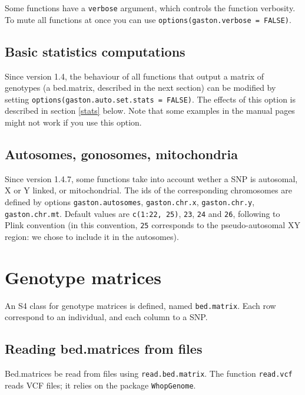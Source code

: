 \documentclass{article}\usepackage[]{graphicx}\usepackage[]{color}
\begin{document}
  Some functions have a \verb!verbose! argument, which controls the
  function verbosity. To mute all functions at once you can use 
  \verb!options(gaston.verbose = FALSE)!.

\subsection{Basic statistics computations}

  Since version 1.4, the behaviour of all functions that output a
  matrix of genotypes (a bed.matrix, described in the next section)
  can be modified by setting \verb!options(gaston.auto.set.stats = FALSE)!.
  The effects of this option is described in section \ref{stats}
  below. Note that some examples in the manual pages might not work if
  you use this option.

\subsection{Autosomes, gonosomes, mitochondria}

  Since version 1.4.7, some functions take into account wether a SNP 
  is autosomal, X or Y linked, or mitochondrial. The ids of the corresponding
  chromosomes are defined by options \verb!gaston.autosomes!, \verb!gaston.chr.x!,
  \verb!gaston.chr.y!, \verb!gaston.chr.mt!. Default values are \verb!c(1:22, 25)!,
  \verb!23!, \verb!24! and \verb!26!, following to Plink convention (in this
  convention, \verb!25! corresponds to the pseudo-autosomal XY region: we chose
  to include it in the autosomes).

\section{Genotype matrices}

  An S4 class for genotype matrices is defined, named \verb!bed.matrix!.
  Each row correspond to an individual, and each column to a SNP. 

\subsection{Reading bed.matrices from files}

  Bed.matrices be read from files using \verb!read.bed.matrix!.
  The function \verb!read.vcf! reads VCF files; it relies on the package \verb!WhopGenome!.
\end{document}
